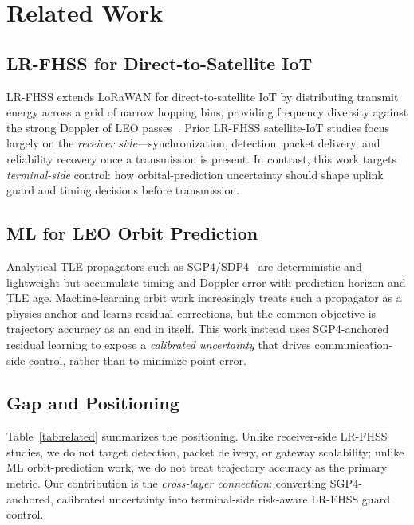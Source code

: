 \documentclass[conference]{IEEEtran}
\begin{document}
\section{Related Work}
\label{sec:related}

\subsection{LR-FHSS for Direct-to-Satellite IoT}
LR-FHSS extends LoRaWAN for direct-to-satellite IoT by distributing transmit energy across a grid of narrow hopping bins, providing frequency diversity against the strong Doppler of LEO passes~\cite{semtech2023lrfhss,hurn2023lrfhss}. Prior LR-FHSS satellite-IoT studies focus largely on the \emph{receiver side}---synchronization, detection, packet delivery, and reliability recovery once a transmission is present. In contrast, this work targets \emph{terminal-side} control: how orbital-prediction uncertainty should shape uplink guard and timing decisions before transmission.

\subsection{ML for LEO Orbit Prediction}
Analytical TLE propagators such as SGP4/SDP4~\cite{hoots1980models,vallado2007fundamentals} are deterministic and lightweight but accumulate timing and Doppler error with prediction horizon and TLE age. Machine-learning orbit work increasingly treats such a propagator as a physics anchor and learns residual corrections, but the common objective is trajectory accuracy as an end in itself. This work instead uses SGP4-anchored residual learning to expose a \emph{calibrated uncertainty} that drives communication-side control, rather than to minimize point error.

\subsection{Gap and Positioning}
Table~\ref{tab:related} summarizes the positioning. Unlike receiver-side LR-FHSS studies, we do not target detection, packet delivery, or gateway scalability; unlike ML orbit-prediction work, we do not treat trajectory accuracy as the primary metric. Our contribution is the \emph{cross-layer connection}: converting SGP4-anchored, calibrated uncertainty into terminal-side risk-aware LR-FHSS guard control.
\end{document}
